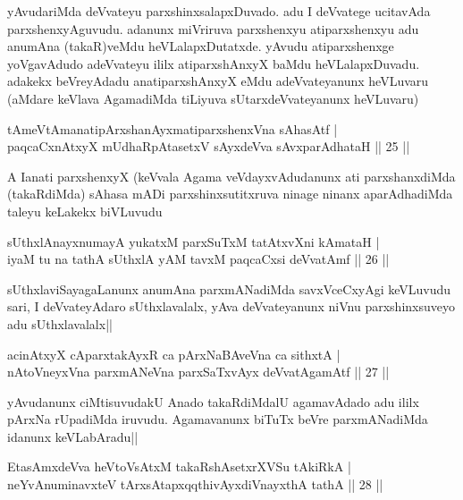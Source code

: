 \begin{artha}
yAvudariMda deVvateyu parxshinxsalapxDuvado. adu I deVvatege ucitavAda parxshenxyAguvudu. adanunx miVriruva parxshenxyu atiparxshenxyu adu anumAna (takaR)veMdu heVLalapxDutatxde. yAvudu atiparxshenxge yoVgavAdudo adeVvateyu ililx atiparxshAnxyX baMdu heVLalapxDuvadu. adakekx beVreyAdadu anatiparxshAnxyX eMdu adeVvateyanunx heVLuvaru (aMdare keVlava AgamadiMda tiLiyuva sUtarxdeVvateyanunx heVLuvaru)
\end{artha}%

\begin{shl}
tAmeVtAmanatipArxshanAyxmatiparxshenxVna sAhasAtf |\\
paqcaCxnAtxyX mUdhaRpAtasetxV sAyxdeVva sAvxparAdhataH \hfill || 25 ||
\end{shl}

\begin{artha}
A Ianati parxshenxyX (keVvala Agama veVdayxvAdudanunx ati parxshanxdiMda (takaRdiMda) sAhasa mADi parxshinxsutitxruva ninage ninanx aparAdhadiMda taleyu keLakekx biVLuvudu 
\end{artha}

\begin{shl}
sUthxlAnayxnumayA yukatxM parxSuTxM tatAtxvXni kAmataH |\\
iyaM tu na tathA sUthxlA yAM tavxM paqcaCxsi deVvatAmf \hfill || 26 ||
\end{shl}

\begin{artha}
sUthxlaviSayagaLanunx anumAna parxmANadiMda savxVceCxyAgi keVLuvudu sari, I deVvateyAdaro sUthxlavalalx, yAva deVvateyanunx niVnu parxshinxsuveyo adu sUthxlavalalx||
\end{artha}

\begin{shl}
acinAtxyX cAparxtakAyxR ca pArxNaBAveVna ca sithxtA |\\
nAtoV\s neyxVna parxmANeVna parxSaTxvAyx deVvatA\s \s gamAtf \hfill || 27 ||
\end{shl}

\begin{artha}
yAvudanunx ciMtisuvudakU Anado takaRdiMdalU agamavAdado adu ililx pArxNa rUpadiMda iruvudu. Agamavanunx biTuTx beVre parxmANadiMda idanunx keVLabAradu|| 
\end{artha}

\begin{shl}
EtasAmxdeVva heVtoVsAtxM takaRshAsetxrXVSu tAkiRkA |\\
neYvAnuminavxteV tArxsAtapxqqthivAyxdiVnayxthA tathA \hfill || 28 ||
\end{shl}

